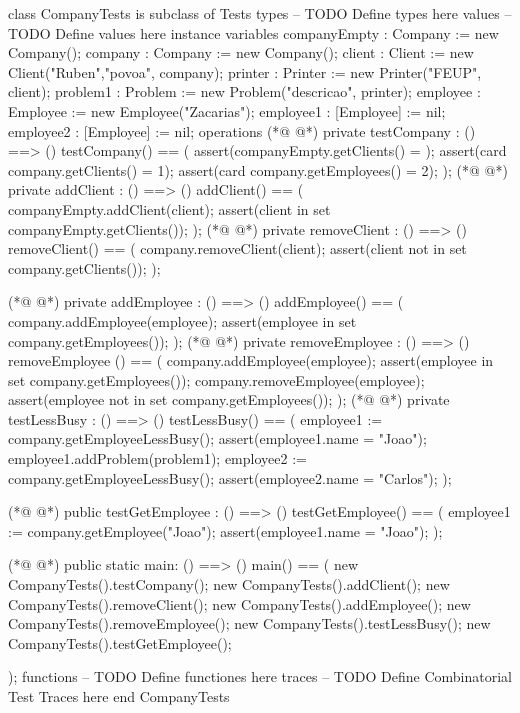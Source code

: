 \begin{vdmpp}[breaklines=true]
class CompanyTests is subclass of Tests
types
-- TODO Define types here
values
-- TODO Define values here
instance variables
companyEmpty : Company := new Company();
company : Company := new Company();
client : Client := new Client("Ruben","povoa", company);
printer : Printer := new Printer("FEUP", client);
problem1 : Problem := new Problem("descricao", printer);
employee : Employee := new Employee("Zacarias");
employee1 : [Employee] := nil;
employee2 : [Employee] := nil;
operations
(*@
\label{testCompany:16}
@*)
private testCompany : () ==> ()
testCompany() ==
(
 assert(companyEmpty.getClients() = {});
 assert(card company.getClients() = 1);
 assert(card company.getEmployees() = 2);
);
(*@
\label{addClient:23}
@*)
private addClient : () ==> ()
addClient() == 
(
 companyEmpty.addClient(client);
 assert(client  in set companyEmpty.getClients());
);
(*@
\label{removeClient:29}
@*)
private removeClient : () ==> ()
removeClient() == 
(
 company.removeClient(client);
 assert(client not in set company.getClients());
);

(*@
\label{addEmployee:36}
@*)
private addEmployee : () ==> ()
addEmployee() == 
(
 company.addEmployee(employee);
 assert(employee  in set company.getEmployees());
);
(*@
\label{removeEmployee:42}
@*)
private removeEmployee : () ==> ()
removeEmployee () == 
(
 company.addEmployee(employee);
 assert(employee in set company.getEmployees());
 company.removeEmployee(employee);
 assert(employee not in set company.getEmployees());
);
(*@
\label{testLessBusy:50}
@*)
private testLessBusy : () ==> ()
testLessBusy() == 
(
employee1 := company.getEmployeeLessBusy();
assert(employee1.name = "Joao");
employee1.addProblem(problem1);
employee2 := company.getEmployeeLessBusy();
assert(employee2.name = "Carlos");
);

(*@
\label{testGetEmployee:60}
@*)
public testGetEmployee : () ==> ()
testGetEmployee() ==
(
employee1 := company.getEmployee("Joao");
assert(employee1.name = "Joao");
);

(*@
\label{main:67}
@*)
public static main: () ==> ()
 main() ==
 (
  new CompanyTests().testCompany();
  new CompanyTests().addClient();
  new CompanyTests().removeClient();
  new CompanyTests().addEmployee();
  new CompanyTests().removeEmployee();
  new CompanyTests().testLessBusy();
  new CompanyTests().testGetEmployee();
  
 );
functions
-- TODO Define functiones here
traces
-- TODO Define Combinatorial Test Traces here
end CompanyTests
\end{vdmpp}
